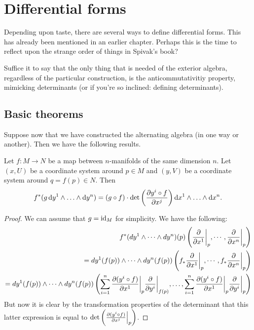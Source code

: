\documentclass[11pt, english]{article}
\begin{document}
\newpage
\section{Differential forms}

Depending upon taste, there are several ways to define differential forms. This has already been mentioned in an earlier chapter. Perhaps this is the time to reflect upon the strange order of things in Spivak's book?

Suffice it to say that the only thing that is needed of the exterior algebra, regardless of the particular construction, is the anticommutativitiy property, mimicking determinants (or if you're so inclined: defining determinants).

\subsection{Basic theorems}
Suppose now that we have constructed the alternating algebra (in one way or another). Then we have the following results.

\begin{thm}
 Let $f:M \to N$ be a map between $n$-manifolds of the same dimension $n$. Let $(x,U)$ be a coordinate system around $p \in M$ and $(y,V)$ be a coordinate system around $q=f(p) \in N$. Then
\[
f^\ast(g\,  \mathrm{d}{y}^1 \wedge \ldots \wedge \mathrm{d}{y}^n) = (g \circ f) \cdot \det \left( \frac{\partial {y^i \circ f}}{\partial {x^j}} \right) \mathrm{d}{x}^1 \wedge \ldots \wedge \mathrm{d}{x}^n.
\]
\end{thm}
\begin{proof}
 We can assume that $g= \text{id}_M$ for simplicity. We have the following:
 \begin{align*}
f ^\ast(dy^1 \wedge \cdots \wedge dy^n)(p)\left(\restr{ \dd{}{x^1}}{p},\cdots,\restr{\dd{}{x^n}}{p}\right)\\
=dy^1(f(p)) \wedge \cdots \wedge dy^n(f(p))\left(f_\ast \restr{\dd{}{x^1}}{p},\cdots,f_\ast\restr{\dd{}{x^n}}{p}\right) \\
=dy^1(f(p)) \wedge \cdots \wedge dy^n(f(p))\left( \sum_{i=1}^n \restr{\dd{(y^i \circ f)}{x^1}}{p} \restr{\dd{}{y^i}}{f(p)},\ldots,\sum_{i=1}^n \restr{\dd{(y^i \circ f)}{x^1}}{p} \restr{\dd{}{y^i}}{p} \right)
 \end{align*}
But now it is clear by the transformation properties of the determinant that this latter expression is equal to $\det \left( \restr{\dd{(y^i \circ f)}{x^j}}{p} \right)$.
\end{proof}
\end{document}
